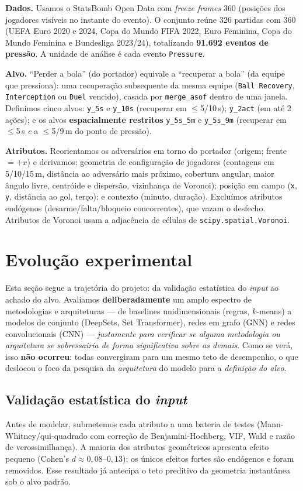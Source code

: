 \documentclass[a4paper,11pt]{article}
\begin{document}
\textbf{Dados.} Usamos o StatsBomb Open Data \citep{statsbomb2021} com \emph{freeze frames} 360 (posições dos jogadores visíveis no instante do evento). O conjunto reúne 326 partidas com 360 (UEFA Euro 2020 e 2024, Copa do Mundo FIFA 2022, Euro Feminina, Copa do Mundo Feminina e Bundesliga 2023/24), totalizando \textbf{91.692 eventos de pressão}. A unidade de análise é cada evento \texttt{Pressure}.

\textbf{Alvo.} ``Perder a bola'' (do portador) equivale a ``recuperar a bola'' (da equipe que pressiona): uma recuperação subsequente da mesma equipe (\texttt{Ball Recovery}, \texttt{Interception} ou \texttt{Duel} vencido), casada por \texttt{merge\_asof} dentro de uma janela. Definimos cinco alvos: \texttt{y\_5s} e \texttt{y\_10s} (recuperar em $\le$5/10\,s); \texttt{y\_2act} (em até 2 ações); e os alvos \textbf{espacialmente restritos} \texttt{y\_5s\_5m} e \texttt{y\_5s\_9m} (recuperar em $\le$5\,s \emph{e} a $\le$5/9\,m do ponto de pressão).

\textbf{Atributos.} Reorientamos os adversários em torno do portador (origem; frente $=+x$) e derivamos: geometria de configuração de jogadores (contagens em 5/10/15\,m, distância ao adversário mais próximo, cobertura angular, maior ângulo livre, centróide e dispersão, vizinhança de Voronoi); posição em campo (\texttt{x}, \texttt{y}, distância ao gol, terço); e contexto (minuto, duração). Excluímos atributos endógenos (desarme/falta/bloqueio concorrentes), que vazam o desfecho. Atributos de Voronoi usam a adjacência de células de \texttt{scipy.spatial.Voronoi}.

\section{Evolução experimental}

Esta seção segue a trajetória do projeto: da validação estatística do \emph{input} ao achado do alvo. Avaliamos \textbf{deliberadamente} um amplo espectro de metodologias e arquiteturas --- de baselines unidimensionais (regras, $k$-means) a modelos de conjunto (DeepSets, Set Transformer), redes em grafo (GNN) e redes convolucionais (CNN) --- \emph{justamente para verificar se alguma metodologia ou arquitetura se sobressairia de forma significativa sobre as demais}. Como se verá, isso \textbf{não ocorreu}: todas convergiram para um mesmo teto de desempenho, o que deslocou o foco da pesquisa da \emph{arquitetura} do modelo para a \emph{definição do alvo}.

\subsection{Validação estatística do \emph{input}}
Antes de modelar, submetemos cada atributo a uma bateria de testes (Mann-Whitney/qui-quadrado com correção de Benjamini-Hochberg, VIF, Wald e razão de verossimilhança). A maioria dos atributos geométricos apresenta efeito pequeno (Cohen's $d \approx 0{,}08$--$0{,}13$); os únicos efeitos fortes são endógenos e foram removidos. Esse resultado já antecipa o teto preditivo da geometria instantânea sob o alvo padrão.
\end{document}
